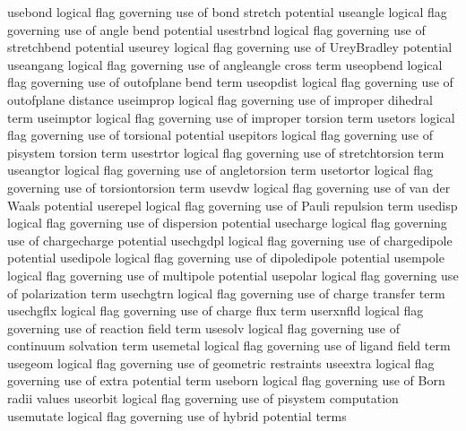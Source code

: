 \documentclass[letterpaper,11pt,english]{sphinxmanual}
\begin{document}
\sphinxAtStartPar
{}

\begin{sphinxVerbatim}[commandchars=\\\{\}]
use\PYGZus{}bond        logical flag governing use of bond stretch potential
use\PYGZus{}angle       logical flag governing use of angle bend potential
use\PYGZus{}strbnd      logical flag governing use of stretch\PYGZhy{}bend potential
use\PYGZus{}urey        logical flag governing use of Urey\PYGZhy{}Bradley potential
use\PYGZus{}angang      logical flag governing use of angle\PYGZhy{}angle cross term
use\PYGZus{}opbend      logical flag governing use of out\PYGZhy{}of\PYGZhy{}plane bend term
use\PYGZus{}opdist      logical flag governing use of out\PYGZhy{}of\PYGZhy{}plane distance
use\PYGZus{}improp      logical flag governing use of improper dihedral term
use\PYGZus{}imptor      logical flag governing use of improper torsion term
use\PYGZus{}tors        logical flag governing use of torsional potential
use\PYGZus{}pitors      logical flag governing use of pi\PYGZhy{}system torsion term
use\PYGZus{}strtor      logical flag governing use of stretch\PYGZhy{}torsion term
use\PYGZus{}angtor      logical flag governing use of angle\PYGZhy{}torsion term
use\PYGZus{}tortor      logical flag governing use of torsion\PYGZhy{}torsion term
use\PYGZus{}vdw         logical flag governing use of van der Waals potential
use\PYGZus{}repel       logical flag governing use of Pauli repulsion term
use\PYGZus{}disp        logical flag governing use of dispersion potential
use\PYGZus{}charge      logical flag governing use of charge\PYGZhy{}charge potential
use\PYGZus{}chgdpl      logical flag governing use of charge\PYGZhy{}dipole potential
use\PYGZus{}dipole      logical flag governing use of dipole\PYGZhy{}dipole potential
use\PYGZus{}mpole       logical flag governing use of multipole potential
use\PYGZus{}polar       logical flag governing use of polarization term
use\PYGZus{}chgtrn      logical flag governing use of charge transfer term
use\PYGZus{}chgflx      logical flag governing use of charge flux term
use\PYGZus{}rxnfld      logical flag governing use of reaction field term
use\PYGZus{}solv        logical flag governing use of continuum solvation term
use\PYGZus{}metal       logical flag governing use of ligand field term
use\PYGZus{}geom        logical flag governing use of geometric restraints
use\PYGZus{}extra       logical flag governing use of extra potential term
use\PYGZus{}born        logical flag governing use of Born radii values
use\PYGZus{}orbit       logical flag governing use of pisystem computation
use\PYGZus{}mutate      logical flag governing use of hybrid potential terms
\end{sphinxVerbatim}
\end{document}

